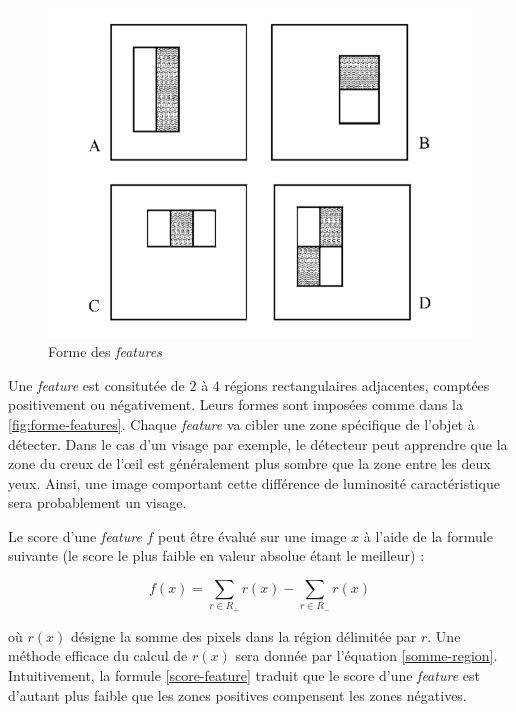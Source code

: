 \documentclass[12pt,a4paper]{article}
\begin{document}
\begin{figure}
        \includegraphics[scale = 0.4]{forme_features}
        \centering
        \caption{Forme des \textit{features}}
        \label{fig:forme-features}
\end{figure}
    
Une \textit{feature} est consitutée de $2$ à $4$ régions rectangulaires adjacentes, comptées positivement ou négativement. Leurs formes sont imposées comme dans la \autoref{fig:forme-features}. 
Chaque \textit{feature} va cibler une zone spécifique de l'objet à détecter. Dans le cas d'un visage par exemple, le détecteur peut apprendre que la zone du creux de l'œil est généralement plus sombre que la zone entre les deux yeux. Ainsi, une image comportant cette différence de luminosité caractéristique sera probablement un visage.


Le score d'une \textit{feature} $f$ peut être évalué sur une image $x$ à l'aide de la formule suivante (le score le plus faible en valeur absolue étant le meilleur) :

\begin{equation}\label{score-feature}
    f(x) = \sum_{r \in R_+} r(x) - \sum_{r \in R_-} r(x)
\end{equation}

où $r(x)$ désigne la somme des pixels dans la région délimitée par $r$. Une méthode efficace du calcul de $r(x)$ sera donnée par l'équation \ref{somme-region}. Intuitivement, la formule \ref{score-feature} traduit que le score d'une \textit{feature} est d'autant plus faible que les zones positives compensent les zones négatives. 
\end{document}
